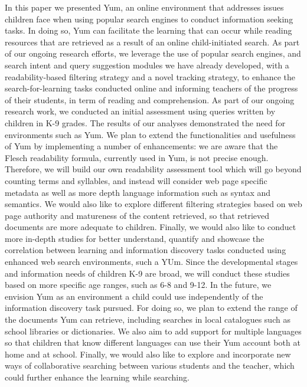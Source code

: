 \documentclass{sig-alternate-05-2015}
\begin{document}
In this paper we presented Yum, an online environment that addresses issues children face when using popular search engines to conduct information seeking tasks. In doing so, Yum can facilitate the learning that can occur while reading resources that are retrieved as a result of an online child-initiated search. As part of our ongoing research efforts, we leverage the use of popular search engines, and search intent and query suggestion modules we have already developed, with a readability-based filtering strategy and a novel tracking strategy, to enhance the search-for-learning tasks conducted online and informing teachers of the progress of their students, in term of reading and comprehension. As part of our ongoing research work, we conducted an initial assessment using queries written by children in K-9 grades. The results of our analyses demonstrated the need for environments such as Yum. 
We plan to extend the functionalities and usefulness of Yum by implementing a number of enhancements: we are aware that the Flesch readability formula, currently used in Yum, is not precise enough. Therefore, we will build our own readability assessment tool which will go beyond counting terms and syllables, and instead will consider web page specific metadata as well as more depth language information such as syntax and semantics.  We would also like to explore different filtering strategies based on web page authority and matureness of the content retrieved, so that retrieved documents are more adequate to children.  Finally, we would also like to conduct  more in-depth studies for better understand, quantify and showcase the correlation between learning and information discovery tasks conducted using enhanced web search environments, such a YUm.  Since the developmental stages and information needs of children K-9 are broad, we will conduct these studies based on more specific age ranges, such as 6-8 and 9-12. 
In the future, we envision Yum as an environment a child could use independently of the information discovery task pursued. For doing so, we plan to extend the range of the documents Yum can retrieve, including searches in local catalogues such as school libraries or dictionaries. We also aim to add support for multiple languages so that children that know different languages can use their Yum account both at home and at school. Finally, we would also like to explore and incorporate new ways of collaborative searching between various students and the teacher, which could further enhance the learning while searching. 


%

%
%
\end{document}
